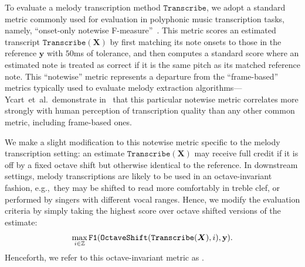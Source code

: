 To evaluate a melody transcription method $\texttt{Transcribe}$, 
we adopt a standard metric commonly used for evaluation in polyphonic music transcription tasks, namely,  ``onset-only notewise F-measure''~\cite{ycart2020investigating}. 
This metric scores an estimated transcript $\texttt{Transcribe}(\bm{X})$ by first matching its note onsets to those in the reference $\bm{y}$ with $50$ms of tolerance, and then computes a standard \fone{} score where an estimated note is treated as correct if it is the same pitch as its matched reference note. 
This ``notewise'' metric represents a departure from the ``frame-based'' metrics typically used to evaluate melody extraction algorithms---Ycart~et~al.\ demonstrate in~\cite{ycart2020investigating} that this particular notewise metric correlates more strongly with human perception of transcription quality than any other common metric, including frame-based ones.

We make a slight modification to this notewise metric 
specific to 
the melody transcription setting: an estimate $\texttt{Transcribe}(\bm{X})$ may receive full credit if it is off by a fixed octave shift but otherwise identical to the reference. 
In downstream settings, melody transcriptions are likely to be used in an octave-invariant fashion, e.g.,~they may be shifted to read more comfortably in treble clef, or performed by singers with different vocal ranges. 
Hence, we modify the evaluation criteria by simply taking the highest score over octave shifted versions of the estimate:
\begin{equation*}
    \max_{i \in \mathbb{Z}} \texttt{\texttt{F1}}(\texttt{OctaveShift}(\texttt{Transcribe}(\mbox{\boldmath{$X$}}), i), \mathbf{y}).
\end{equation*}
Henceforth, we refer to this octave-invariant metric as \fone. 